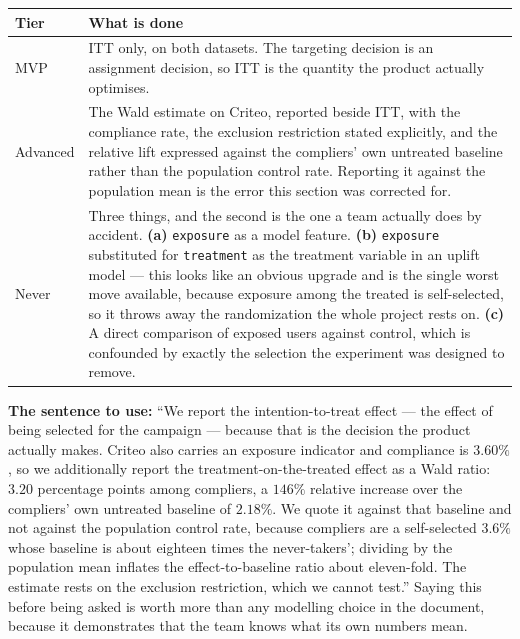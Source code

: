 \documentclass[11pt,a4paper]{article}
\begin{document}
\begin{tabularx}{\textwidth}{@{}L{3.2cm}X@{}}
\toprule
\textbf{Tier} & \textbf{What is done} \\
\midrule
MVP & ITT only, on both datasets. The targeting decision is an assignment decision, so ITT is the
quantity the product actually optimises. \\
Advanced & The Wald estimate on Criteo, reported beside ITT, with the compliance rate, the exclusion
restriction stated explicitly, and the relative lift expressed against the compliers' own untreated
baseline rather than the population control rate. Reporting it against the population mean is the
error this section was corrected for. \\
Never & Three things, and the second is the one a team actually does by accident.
\textbf{(a)} \texttt{exposure} as a model feature.
\textbf{(b)} \texttt{exposure} substituted for \texttt{treatment} as the treatment variable in an
uplift model --- this looks like an obvious upgrade and is the single worst move available, because
exposure among the treated is self-selected, so it throws away the randomization the whole project
rests on.
\textbf{(c)} A direct comparison of exposed users against control, which is confounded by exactly
the selection the experiment was designed to remove. \\
\bottomrule
\end{tabularx}

\begin{keybox}
\textbf{The sentence to use:} ``We report the intention-to-treat effect --- the effect of being
selected for the campaign --- because that is the decision the product actually makes. Criteo also
carries an exposure indicator and compliance is $3.60\%$, so we additionally report the
treatment-on-the-treated effect as a Wald ratio: $3.20$ percentage points among compliers, a $146\%$
relative increase over the compliers' own untreated baseline of $2.18\%$. We quote it against that
baseline and not against the population control rate, because compliers are a self-selected $3.6\%$
whose baseline is about eighteen times the never-takers'; dividing by the population mean inflates
the effect-to-baseline ratio about eleven-fold. The estimate rests on the exclusion restriction, which we cannot
test.'' Saying this
before being asked is worth more than any modelling choice in the document, because it demonstrates
that the team knows what its own numbers mean.
\end{keybox}
\end{document}
